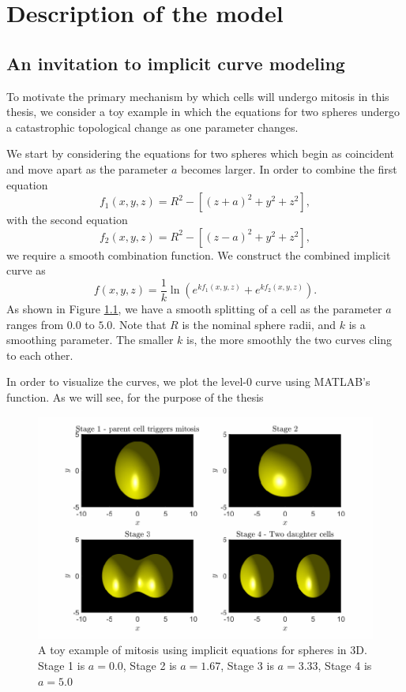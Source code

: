 \chapter{ Description of the model \label{ch:numero_uno}}
\section{An invitation to implicit curve modeling}
To motivate the primary mechanism by which cells will undergo mitosis in this thesis, we consider a toy example in which the equations for two spheres undergo a catastrophic topological change as one parameter changes.

We start by considering the equations for two spheres which begin as coincident and move apart as the parameter $a$ becomes larger. In order to combine the first equation
\begin{equation*}
f_1(x,y,z) = R^2 - \left[ (z+a)^2+y^2+z^2 \right],
\end{equation*}
with the second equation
\begin{equation*}
f_2(x,y,z) = R^2 - \left[ (z-a)^2+y^2+z^2 \right],
\end{equation*}
we require a smooth combination function. We construct the combined implicit curve as
\begin{equation*}
f(x,y,z) = \frac{1}{k}\ln{ \left( e^{k f_1(x,y,z)}+ e^{k f_2(x,y,z)} \right) }.
\end{equation*}
As shown in Figure \ref{fig:ToyMitosis}, we have a smooth splitting of a cell as the parameter $a$ ranges from $0.0$ to $5.0$. Note that $R$ is the nominal sphere radii, and $k$ is a smoothing parameter. The smaller $k$ is, the more smoothly the two curves cling to each other. 

In order to visualize the curves, we plot the level-$0$ curve using MATLAB's  function. As we will see, for the purpose of the thesis

\begin{figure}[h]
\centering
\includegraphics[width=1\textwidth]{chapter1/figures/CellDivisionDemo.pdf}
\caption{A toy example of mitosis using implicit equations for spheres in 3D. Stage 1 is $a= 0.0$, Stage 2 is $a= 1.67$, Stage 3 is $a=3.33$, Stage 4 is $a = 5.0$}
\label{fig:ToyMitosis}
\end{figure}
\filbreak

